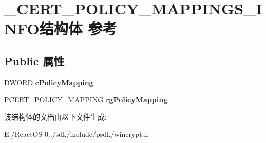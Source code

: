 \hypertarget{struct___c_e_r_t___p_o_l_i_c_y___m_a_p_p_i_n_g_s___i_n_f_o}{}\section{\+\_\+\+C\+E\+R\+T\+\_\+\+P\+O\+L\+I\+C\+Y\+\_\+\+M\+A\+P\+P\+I\+N\+G\+S\+\_\+\+I\+N\+F\+O结构体 参考}
\label{struct___c_e_r_t___p_o_l_i_c_y___m_a_p_p_i_n_g_s___i_n_f_o}
\subsection*{Public 属性}
\begin{DoxyCompactItemize}
\item 
\mbox{\label{struct___c_e_r_t___p_o_l_i_c_y___m_a_p_p_i_n_g_s___i_n_f_o_abf97f26dd7a1f7f851158146b46fc5a1}} 
D\+W\+O\+RD {\bfseries c\+Policy\+Mapping}
\item 
\mbox{\label{struct___c_e_r_t___p_o_l_i_c_y___m_a_p_p_i_n_g_s___i_n_f_o_acfa33300109d2454a66e65f7d13ca801}} 
\hyperlink{struct___c_e_r_t___p_o_l_i_c_y___m_a_p_p_i_n_g}{P\+C\+E\+R\+T\+\_\+\+P\+O\+L\+I\+C\+Y\+\_\+\+M\+A\+P\+P\+I\+NG} {\bfseries rg\+Policy\+Mapping}
\end{DoxyCompactItemize}


该结构体的文档由以下文件生成\+:\begin{DoxyCompactItemize}
\item 
E\+:/\+React\+O\+S-\/0../sdk/include/psdk/wincrypt.\+h\end{DoxyCompactItemize}
